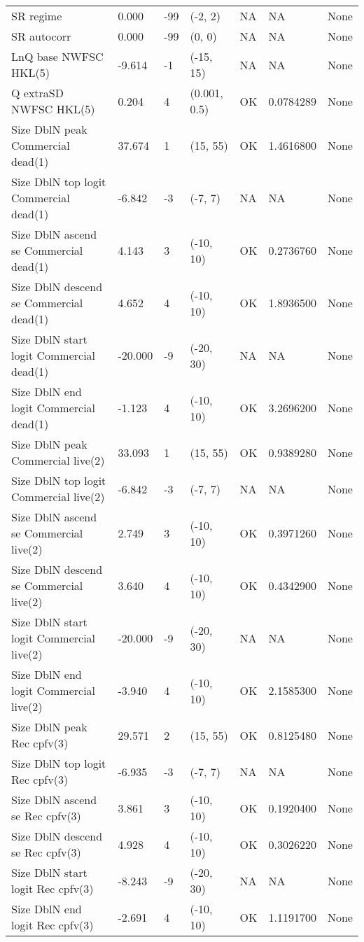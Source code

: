 \documentclass[11pt,
  english,
  letterpaper,
]{article}
\begin{document}
\begin{landscape}
\begin{longtable}[t]{>{\raggedright\arraybackslash}p{7cm}lllll>{\raggedright\arraybackslash}p{4cm}}
SR regime & 0.000 & -99 & (-2, 2) & NA & NA & None\\
SR autocorr & 0.000 & -99 & (0, 0) & NA & NA & None\\
LnQ base NWFSC HKL(5) & -9.614 & -1 & (-15, 15) & NA & NA & None\\
Q extraSD NWFSC HKL(5) & 0.204 & 4 & (0.001, 0.5) & OK & 0.0784289 & None\\
Size DblN peak Commercial dead(1) & 37.674 & 1 & (15, 55) & OK & 1.4616800 & None\\
Size DblN top logit Commercial dead(1) & -6.842 & -3 & (-7, 7) & NA & NA & None\\
Size DblN ascend se Commercial dead(1) & 4.143 & 3 & (-10, 10) & OK & 0.2736760 & None\\
Size DblN descend se Commercial dead(1) & 4.652 & 4 & (-10, 10) & OK & 1.8936500 & None\\
Size DblN start logit Commercial dead(1) & -20.000 & -9 & (-20, 30) & NA & NA & None\\
Size DblN end logit Commercial dead(1) & -1.123 & 4 & (-10, 10) & OK & 3.2696200 & None\\
Size DblN peak Commercial live(2) & 33.093 & 1 & (15, 55) & OK & 0.9389280 & None\\
Size DblN top logit Commercial live(2) & -6.842 & -3 & (-7, 7) & NA & NA & None\\
Size DblN ascend se Commercial live(2) & 2.749 & 3 & (-10, 10) & OK & 0.3971260 & None\\
Size DblN descend se Commercial live(2) & 3.640 & 4 & (-10, 10) & OK & 0.4342900 & None\\
Size DblN start logit Commercial live(2) & -20.000 & -9 & (-20, 30) & NA & NA & None\\
Size DblN end logit Commercial live(2) & -3.940 & 4 & (-10, 10) & OK & 2.1585300 & None\\
Size DblN peak Rec cpfv(3) & 29.571 & 2 & (15, 55) & OK & 0.8125480 & None\\
Size DblN top logit Rec cpfv(3) & -6.935 & -3 & (-7, 7) & NA & NA & None\\
Size DblN ascend se Rec cpfv(3) & 3.861 & 3 & (-10, 10) & OK & 0.1920400 & None\\
Size DblN descend se Rec cpfv(3) & 4.928 & 4 & (-10, 10) & OK & 0.3026220 & None\\
Size DblN start logit Rec cpfv(3) & -8.243 & -9 & (-20, 30) & NA & NA & None\\
Size DblN end logit Rec cpfv(3) & -2.691 & 4 & (-10, 10) & OK & 1.1191700 & None\\

\end{longtable}
\end{landscape}
\end{document}
